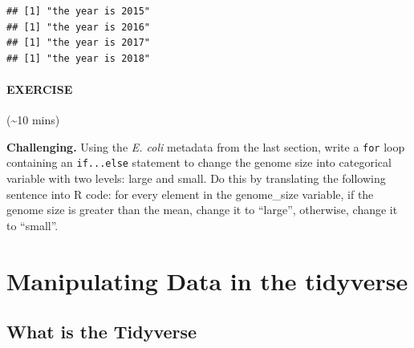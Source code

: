 \documentclass[]{book}
\begin{document}
\begin{verbatim}
## [1] "the year is 2015"
## [1] "the year is 2016"
## [1] "the year is 2017"
## [1] "the year is 2018"
\end{verbatim}

\hypertarget{exercise-13}{%
\subsubsection*{EXERCISE}\label{exercise-13}}

(\textasciitilde{}10 mins)

\textbf{Challenging.} Using the \emph{E. coli} metadata from the last section, write a \texttt{for} loop containing an \texttt{if...else} statement to change the genome size into categorical variable with two levels: large and small.
Do this by translating the following sentence into R code: for every element in the genome\_size variable, if the genome size is greater than the mean, change it to ``large'', otherwise, change it to ``small''.

\hypertarget{manipulating-data-in-the-tidyverse}{%
\chapter{Manipulating Data in the tidyverse}\label{manipulating-data-in-the-tidyverse}}

\hypertarget{what-is-the-tidyverse}{%
\section{What is the Tidyverse}\label{what-is-the-tidyverse}}
\end{document}
